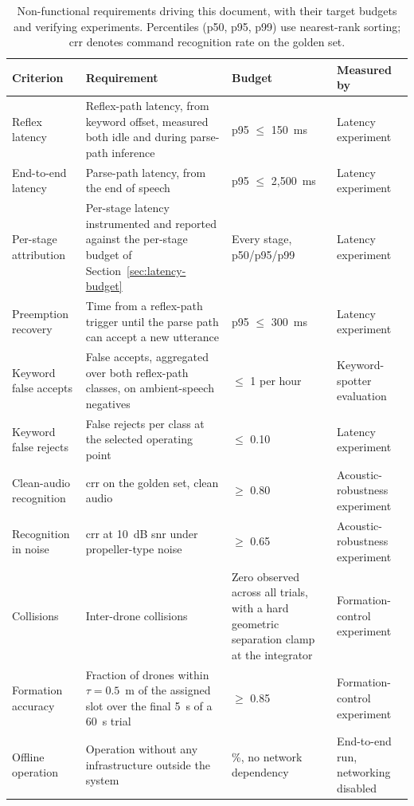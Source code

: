 \begin{table}[htbp]
\centering
\caption[Non-functional requirements driving this document]{Non-functional requirements driving this document, with their target budgets and verifying experiments. Percentiles (p50, p95, p99) use nearest-rank sorting; \acrshort{crr} denotes command recognition rate on the golden set.}
\label{tab:nonfunctional-requirements}
\begin{tabularx}{\textwidth}{@{}>{\raggedright\arraybackslash}p{2.6cm} >{\hsize=1.35\hsize}X >{\hsize=0.65\hsize}X >{\raggedright\arraybackslash}p{2.8cm}@{}}
\toprule
Criterion & Requirement & Budget & Measured by \\
\midrule
Reflex latency & Reflex-path latency, from keyword offset, measured both idle and during parse-path inference & p95 $\leq$ 150~ms & Latency experiment \\
End-to-end latency & Parse-path latency, from the end of speech & p95 $\leq$ 2{,}500~ms & Latency experiment \\
Per-stage attribution & Per-stage latency instrumented and reported against the per-stage budget of Section~\ref{sec:latency-budget} & Every stage, p50/p95/p99 & Latency experiment \\
Preemption recovery & Time from a reflex-path trigger until the parse path can accept a new utterance & p95 $\leq$ 300~ms & Latency experiment \\
Keyword false accepts & False accepts, aggregated over both reflex-path classes, on ambient-speech negatives & $\leq$ 1 per hour & Keyword-spotter evaluation \\
Keyword false rejects & False rejects per class at the selected operating point & $\leq$ 0.10 & Latency experiment \\
Clean-audio recognition & \gls{crr} on the golden set, clean audio & $\geq$ 0.80 & Acoustic-robustness experiment \\
Recognition in noise & \gls{crr} at 10~dB \gls{snr} under propeller-type noise & $\geq$ 0.65 & Acoustic-robustness experiment \\
Collisions & Inter-drone collisions & Zero observed across all trials, with a hard geometric separation clamp at the integrator & Formation-control experiment \\
Formation accuracy & Fraction of drones within $\tau = 0.5$~m of the assigned slot over the final 5~s of a 60~s trial & $\geq$ 0.85 & Formation-control experiment \\
Offline operation & Operation without any infrastructure outside the system & 100\%, no network dependency & End-to-end run, networking disabled \\
\bottomrule
\end{tabularx}
\end{table}

